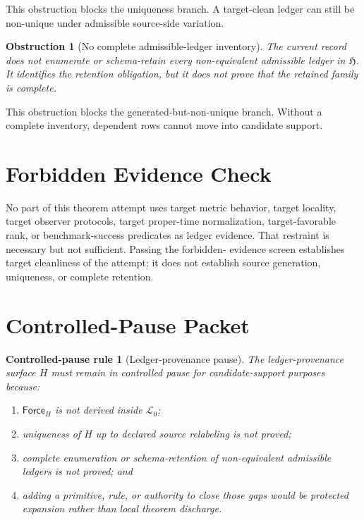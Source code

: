 \documentclass[11pt]{article}
\newcommand{\Lang}{\mathcal{L}_{0}}
\newcommand{\LedgerFam}{\mathfrak{H}}
\newcommand{\ForceH}{\mathsf{Force}_{H}}
\newtheorem{obstruction}{Obstruction}
\newtheorem{pauserule}{Controlled-pause rule}
\begin{document}
This obstruction blocks the uniqueness branch. A target-clean ledger can
still be non-unique under admissible source-side variation.

\begin{obstruction}[No complete admissible-ledger inventory]
The current record does not enumerate or schema-retain every non-equivalent
admissible ledger in \(\LedgerFam\). It identifies the retention obligation,
but it does not prove that the retained family is complete.
\end{obstruction}

This obstruction blocks the generated-but-non-unique branch. Without a
complete inventory, dependent rows cannot move into candidate support.

\section{Forbidden Evidence Check}

No part of this theorem attempt uses target metric behavior, target
locality, target observer protocols, target proper-time normalization,
target-favorable rank, or benchmark-success predicates as ledger evidence.
That restraint is necessary but not sufficient. Passing the forbidden-
evidence screen establishes target cleanliness of the attempt; it does not
establish source generation, uniqueness, or complete retention.

\section{Controlled-Pause Packet}

\begin{pauserule}[Ledger-provenance pause]
The ledger-provenance surface \(H\) must remain in controlled pause for
candidate-support purposes because:
\begin{enumerate}
    \item \(\ForceH\) is not derived inside \(\Lang\);
    \item uniqueness of \(H\) up to declared source relabeling is not
    proved;
    \item complete enumeration or schema-retention of non-equivalent
    admissible ledgers is not proved; and
    \item adding a primitive, rule, or authority to close those gaps would
    be protected expansion rather than local theorem discharge.
\end{enumerate}
\end{pauserule}
\end{document}
